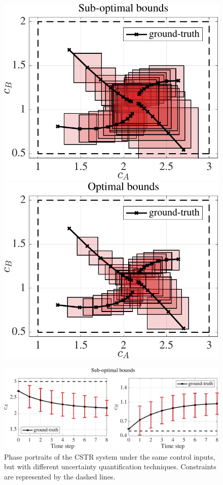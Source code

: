 \begin{figure}[t]
	\centering
	\includegraphics[scale=0.4]{../images/chap2_numex_ex3_phase_subopt.pdf} \hspace{5pt}
	\includegraphics[scale=0.4]{../images/chap2_numex_ex3_phase_opt.pdf} 
	\caption{Phase portraits of the CSTR system under the same control inputs, but with different uncertainty quantification techniques. Constraints are represented by the dashed lines.}
	\label{fig:ex3_phase}
	\vspace{15pt}
	\includegraphics[scale=0.4]{../images/chap2_numex_ex3_time_subopt.pdf} \hspace{5pt}

\end{figure}
